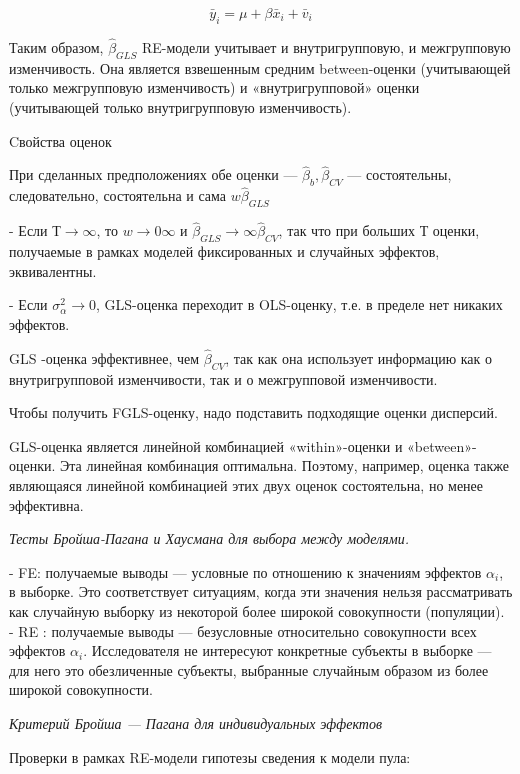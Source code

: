\documentclass[a4paper,8pt]{article} %
\begin{document}
$$\bar{y}_i = \mu + \beta \bar{x}_i + \bar{v}_i $$


Таким образом, $\hat{\beta}_{GLS} $ RE-модели  учитывает и внутригрупповую, и межгрупповую изменчивость. Она
является взвешенным средним between-оценки (учитывающей
только межгрупповую изменчивость) и «внутригрупповой» оценки (учитывающей только внутригрупповую изменчивость). 



Cвойства  оценок


При сделанных предположениях обе оценки —  $\hat{\beta}_{b}, \hat{\beta}_{CV}$  — состоятельны, следовательно, состоятельна
и сама  $ w \hat{\beta}_{GLS} $ 

- Если $ Т \to \infty $, то $  w \to 0 \infty $  и $ \hat{\beta}_{GLS} \to \infty  \hat{\beta}_{CV}$,  так что при больших $Т$ оценки, получаемые в рамках моделей фиксированных и случайных эффектов, эквивалентны.

- Если $  \sigma^2_\alpha \to 0 $,  GLS-оценка переходит в OLS-оценку, т.е. в пределе нет никаких эффектов.


GLS -оценка эффективнее, чем $\hat{\beta}_{CV}$, так как она использует информацию как о внутригрупповой изменчивости, так и о межгрупповой изменчивости.



Чтобы получить FGLS-оценку, надо подставить подходящие оценки дисперсий. 


GLS-оценка является линейной комбинацией «within»-оценки и «between»-
оценки. Эта линейная комбинация оптимальна. Поэтому, например, оценка
также являющаяся линейной комбинацией этих двух оценок состоятельна, но менее эффективна.


\textit{Тесты Бройша-Пагана и Хаусмана для выбора между моделями.}

- FE: получаемые выводы — условные по отношению к значениям эффектов $\alpha_i$, в выборке. Это соответствует ситуациям, когда эти значения нельзя рассматривать как случайную выборку из некоторой более широкой совокупности (популяции). 
- RE : получаемые выводы — безусловные относительно совокупности всех эффектов $\alpha_i$. Исследователя не интересуют конкретные субъекты в выборке — для него это обезличенные субъекты, выбранные случайным образом из более широкой совокупности.



\textit{Критерий Бройша — Пагана для индивидуальных эффектов
}

Проверки в рамках RE-модели гипотезы сведения к модели пула:
\end{document}
